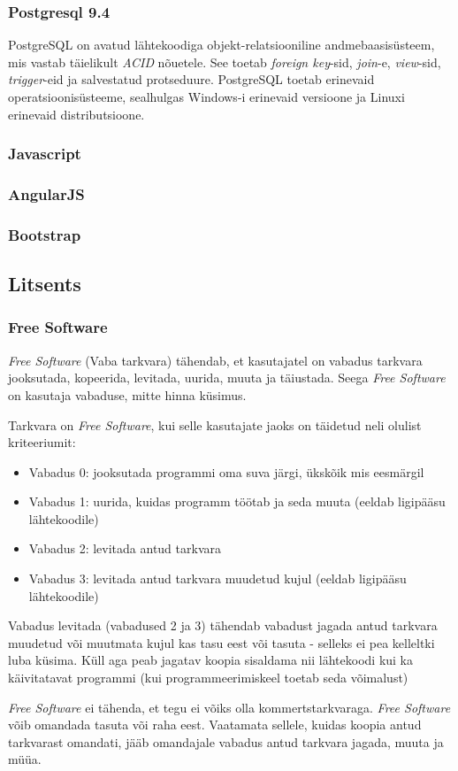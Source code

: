 \documentclass[a4paper,12pt]{article} %
\begin{document}
\subsubsection{Postgresql 9.4}
PostgreSQL on avatud lähtekoodiga objekt-relatsiooniline andmebaasisüsteem, mis vastab täielikult \textit{ACID} nõuetele. See toetab \textit{foreign key}-sid, \textit{join}-e, \textit{view}-sid, \textit{trigger}-eid ja salvestatud protseduure. PostgreSQL toetab erinevaid operatsioonisüsteeme, sealhulgas Windows-i erinevaid versioone ja Linuxi erinevaid distributsioone.
\cite{PostgreSQL_About}
\subsubsection{Javascript}
\subsubsection{AngularJS}
\subsubsection{Bootstrap}
\subsection{Litsents}
\subsubsection{Free Software}
\textit{Free Software} (Vaba tarkvara) tähendab, et kasutajatel on vabadus tarkvara jooksutada, kopeerida, levitada, uurida, muuta ja täiustada. Seega \textit{Free Software} on kasutaja vabaduse, mitte hinna küsimus. \par
Tarkvara on \textit{Free Software}, kui selle kasutajate jaoks on täidetud neli olulist kriteeriumit:
\begin{itemize}
\item Vabadus 0: jooksutada programmi oma suva järgi, ükskõik mis eesmärgil
\item Vabadus 1: uurida, kuidas programm töötab ja seda muuta (eeldab ligipääsu lähtekoodile)
\item Vabadus 2: levitada antud tarkvara
\item Vabadus 3: levitada antud tarkvara muudetud kujul (eeldab ligipääsu lähtekoodile)
\end{itemize}
Vabadus levitada (vabadused 2 ja 3) tähendab vabadust jagada antud tarkvara muudetud või muutmata kujul kas tasu eest või tasuta - selleks ei pea kelleltki luba küsima. Küll aga peab jagatav koopia sisaldama nii lähtekoodi kui ka käivitatavat programmi (kui programmeerimiskeel toetab seda võimalust)\par
\textit{Free Software} ei tähenda, et tegu ei võiks olla kommertstarkvaraga. \textit{Free Software} võib omandada tasuta või raha eest. Vaatamata sellele, kuidas koopia antud tarkvarast omandati,  jääb omandajale vabadus antud tarkvara jagada, muuta ja müüa.
\cite{GNU_Free_SW}
\end{document}
